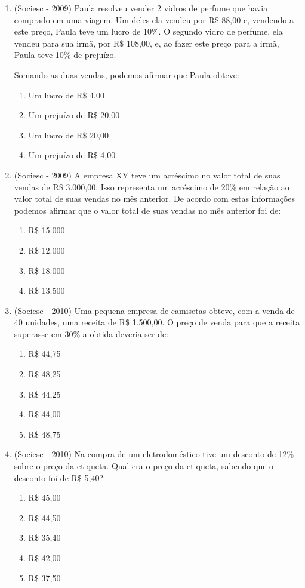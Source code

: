 \begin{enumerate}
 \item (Sociesc - 2009) Paula resolveu vender 2 vidros de perfume que havia comprado em uma viagem. Um deles ela vendeu por R\$ 88,00 e, vendendo a este preço, Paula teve um lucro de 10\%. O segundo vidro de perfume, ela vendeu para sua irmã, por R\$ 108,00, e, ao fazer este preço para a irmã, Paula teve 10\% de prejuízo.

  Somando as duas vendas, podemos afirmar que Paula obteve:
  \begin{enumerate}
  \item Um lucro de R\$ 4,00
  \item Um prejuízo de R\$ 20,00
  \item Um lucro de R\$ 20,00
  \item Um prejuízo de R\$ 4,00
 \end{enumerate}

 \item (Sociesc - 2009) A empresa XY teve um acréscimo no valor total de suas vendas de R\$ 3.000,00. Isso representa um acréscimo de 20\% em relação ao valor total de suas vendas no mês anterior. De acordo com estas informações podemos afirmar que o valor total de suas vendas no mês anterior foi de:
  \begin{enumerate}
  \item R\$ 15.000
  \item R\$ 12.000
  \item R\$ 18.000
  \item R\$ 13.500
 \end{enumerate}

 \item (Sociesc - 2010) Uma pequena empresa de camisetas obteve, com a venda de 40 unidades, uma receita de R\$ 1.500,00. O preço de venda para que a receita superasse em 30\% a obtida deveria ser de:
  \begin{enumerate}
  \item R\$ 44,75
  \item R\$ 48,25
  \item R\$ 44,25
  \item R\$ 44,00
  \item R\$ 48,75
 \end{enumerate}

 \item (Sociesc - 2010) Na compra de um eletrodoméstico tive um desconto de 12\% sobre o preço da etiqueta. Qual era o preço da etiqueta, sabendo que o desconto foi de R\$ 5,40?
  \begin{enumerate}
  \item R\$ 45,00
  \item R\$ 44,50
  \item R\$ 35,40
  \item R\$ 42,00
  \item R\$ 37,50
 \end{enumerate}


\end{enumerate}
